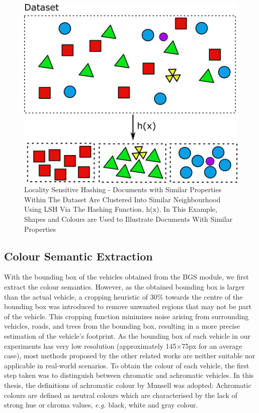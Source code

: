 \begin{figure}[hbt!]\centering
\includegraphics[width=.7\textwidth]{image/new/lsh.png}
\caption{Locality Sensitive Hashing - Documents with Similar Properties Within The Dataset Are Clustered Into Similar Neighbourhood Using LSH Via The Hashing Function, h(x). In This Example, Shapes and Colours are Used to Illustrate Documents With Similar Properties}
\label{fig:lshexample}
\end{figure}

\subsection{Colour Semantic Extraction }
\label{section:versionOneColorExtract}

With the bounding box of the vehicles obtained from the BGS module, we first extract the colour semantics.
However, as the obtained bounding box is larger than the actual vehicle, a cropping heuristic of 30\% towards the centre of the bounding box was introduced to remove unwanted regions that may not be part of the vehicle.
This cropping function minimizes noise arising from surrounding vehicles, roads, and trees from the bounding box, resulting in a more precise estimation of the vehicle's footprint.
As the bounding box of each vehicle in our experiments has very low resolution (approximately 145$\times$75px for an average case), most methods proposed by the other related works are neither suitable nor applicable in real-world scenarios.
To obtain the colour of each vehicle, the first step taken was to distinguish between chromatic and achromatic vehicles.
In this thesis, the definitions of achromatic colour by Munsell was adopted: Achromatic colours are defined as neutral colours which are characterised by the lack of strong hue or chroma values, \emph{e.g.} black, white and gray colour.

